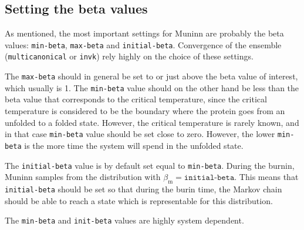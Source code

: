\begin{optiontable}
\end{optiontable}


\subsection{Setting the beta values}
As mentioned, the most important settings for Muninn are probably the
beta values: \texttt{min-beta}, \texttt{max-beta} and
\texttt{initial-beta}. Convergence of the ensemble
(\texttt{multicanonical} or \texttt{invk}) rely highly on the choice
of these settings.

The \texttt{max-beta} should in general be set to or just above the
beta value of interest, which usually is 1. The \texttt{min-beta}
value should on the other hand be less than the beta value that
corresponds to the critical temperature, since the critical
temperature is considered to be the boundary where the protein goes
from an unfolded to a folded state. However, the critical temperature
is rarely known, and in that case \texttt{min-beta} value should be
set close to zero. However, the lower \texttt{min-beta} is the more
time the system will spend in the unfolded state.

The \texttt{initial-beta} value is by default set equal to
\texttt{min-beta}. During the burnin, Muninn samples from the
distribution with $\beta_{\mathrm{m}}=\texttt{initial-beta}$. This
means that \texttt{initial-beta} should be set so that during the
burin time, the Markov chain should be able to reach a state which is
representable for this distribution.

The \texttt{min-beta} and \texttt{init-beta} values are highly system
dependent.
